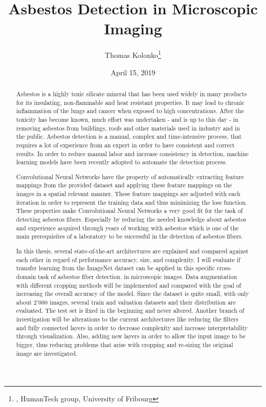 \documentclass[11pt,a4paper,twoside,hidelinks,openright]{rvsmaster}
\author{Thomas Kolonko\thanks{\email{thomas.kolonko@students.unibe.ch}, HumanTech group, University of Fribourg}}
\title{Asbestos Detection in Microscopic Imaging}
\date{April 15, 2019} %
\begin{document}
\maketitle
\thispagestyle{empty}
\mbox{}

\newpage

\begin{abstract}

Asbestos is a highly toxic silicate mineral that has been used widely in many products for its insulating, non-flammable and heat resistant properties. It may lead to chronic inflammation of the lungs and cancer when exposed to high concentrations. After the toxicity has become known, much effort was undertaken - and is up to this day - in removing asbestos from buildings, roofs and other materials used in industry and in the public. Asbestos detection is a manual, complex and time-intensive process, that requires a lot of experience from an expert in order to have consistent and correct results. In order to reduce manual labor and increase consistency in detection, machine learning models have been recently adopted to automate the detection process.

\vspace{5mm} %

Convolutional Neural Networks have the property of automatically extracting feature mappings from the provided dataset and applying these feature mappings on the images in a spatial relevant manner. These feature mappings are adjusted with each iteration in order to represent the training data and thus minimizing the loss function. These properties make Convolutional Neural Networks a very good fit for the task of detecting asbestos fibers. Especially by reducing the needed knowledge about asbestos and experience acquired through years of working with asbestos which is one of the main prerequisites of a laboratory to be successful in the detection of asbestos fibers.

\vspace{5mm} %

In this thesis, several state-of-the-art architectures are explained and compared against each other in regard of performance accuracy, size, and complexity. I will evaluate if transfer learning from the ImageNet dataset can be applied in this specific cross-domain task of asbestos fiber detection. in microscopic images. Data augmentation with different cropping methods will be implemented and compared with the goal of increasing the overall accuracy of the model. Since the dataset is quite small, with only about 2'000 images, several train and valuation datasets and their distribution are evaluated. The test set is fixed in the beginning and never altered. Another branch of investigation will be alterations to the current architectures like reducing the filters and fully connected layers in order to decrease complexity and increase interpretability through visualization. Also, adding new layers in order to allow the input image to be bigger, thus reducing problems that arise with cropping and re-sizing the original image are investigated.

\end{abstract}
\end{document}
